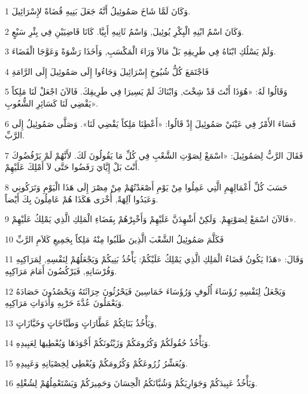 \par 1 وَكَانَ لَمَّا شَاخَ صَمُوئِيلُ أَنَّهُ جَعَلَ بَنِيهِ قُضَاةً لإِسْرَائِيلَ.
\par 2 وَكَانَ اسْمُ ابْنِهِ الْبِكْرِ يُوئِيلَ, وَاسْمُ ثَانِيهِ أَبِيَّا. كَانَا قَاضِيَيْنِ فِي بِئْرِ سَبْعٍ.
\par 3 وَلَمْ يَسْلُكِ ابْنَاهُ فِي طَرِيقِهِ بَلْ مَالاَ وَرَاءَ الْمَكْسَبِ, وَأَخَذَا رَشْوَةً وَعَوَّجَا الْقَضَاءَ.
\par 4 فَاجْتَمَعَ كُلُّ شُيُوخِ إِسْرَائِيلَ وَجَاءُوا إِلَى صَمُوئِيلَ إِلَى الرَّامَةِ
\par 5 وَقَالُوا لَهُ: «هُوَذَا أَنْتَ قَدْ شِخْتَ, وَابْنَاكَ لَمْ يَسِيرَا فِي طَرِيقِكَ. فَالآنَ اجْعَلْ لَنَا مَلِكاً يَقْضِي لَنَا كَسَائِرِ الشُّعُوبِ».
\par 6 فَسَاءَ الأَمْرُ فِي عَيْنَيْ صَمُوئِيلَ إِذْ قَالُوا: «أَعْطِنَا مَلِكاً يَقْضِي لَنَا». وَصَلَّى صَمُوئِيلُ إِلَى الرَّبِّ.
\par 7 فَقَالَ الرَّبُّ لِصَمُوئِيلَ: «اسْمَعْ لِصَوْتِ الشَّعْبِ فِي كُلِّ مَا يَقُولُونَ لَكَ. لأَنَّهُمْ لَمْ يَرْفُضُوكَ أَنْتَ بَلْ إِيَّايَ رَفَضُوا حَتَّى لاَ أَمْلِكَ عَلَيْهِمْ.
\par 8 حَسَبَ كُلِّ أَعْمَالِهِمِ الَّتِي عَمِلُوا مِنْ يَوْمِ أَصْعَدْتُهُمْ مِنْ مِصْرَ إِلَى هَذَا الْيَوْمِ وَتَرَكُونِي وَعَبَدُوا آلِهَةً, أُخْرَى هَكَذَا هُمْ عَامِلُونَ بِكَ أَيْضاً.
\par 9 فَالآنَ اسْمَعْ لِصَوْتِهِمْ. وَلَكِنْ أَشْهِدَنَّ عَلَيْهِمْ وَأَخْبِرْهُمْ بِقَضَاءِ الْمَلِكِ الَّذِي يَمْلِكُ عَلَيْهِمْ».
\par 10 فَكَلَّمَ صَمُوئِيلُ الشَّعْبَ الَّذِينَ طَلَبُوا مِنْهُ مَلِكاً بِجَمِيعِ كَلاَمِ الرَّبِّ
\par 11 وَقَالَ: «هَذَا يَكُونُ قَضَاءُ الْمَلِكِ الَّذِي يَمْلِكُ عَلَيْكُمْ: يَأْخُذُ بَنِيكُمْ وَيَجْعَلُهُمْ لِنَفْسِهِ, لِمَرَاكِبِهِ وَفُرْسَانِهِ, فَيَرْكُضُونَ أَمَامَ مَرَاكِبِهِ.
\par 12 وَيَجْعَلُ لِنَفْسِهِ رُؤَسَاءَ أُلُوفٍ وَرُؤَسَاءَ خَمَاسِينَ فَيَحْرُثُونَ حِرَاثَتَهُ وَيَحْصُدُونَ حَصَادَهُ وَيَعْمَلُونَ عُدَّةَ حَرْبِهِ وَأَدَوَاتِ مَرَاكِبِهِ.
\par 13 وَيَأْخُذُ بَنَاتِكُمْ عَطَّارَاتٍ وَطَبَّاخَاتٍ وَخَبَّازَاتٍ,
\par 14 وَيَأْخُذُ حُقُولَكُمْ وَكُرُومَكُمْ وَزَيْتُونَكُمْ أَجْوَدَهَا وَيُعْطِيهَا لِعَبِيدِهِ.
\par 15 وَيُعَشِّرُ زُرُوعَكُمْ وَكُرُومَكُمْ وَيُعْطِي لِخِصْيَانِهِ وَعَبِيدِهِ.
\par 16 وَيَأْخُذُ عَبِيدَكُمْ وَجَوَارِيَكُمْ وَشُبَّانَكُمُ الْحِسَانَ وَحَمِيرَكُمْ وَيَسْتَعْمِلُهُمْ لِشُغْلِهِ.
